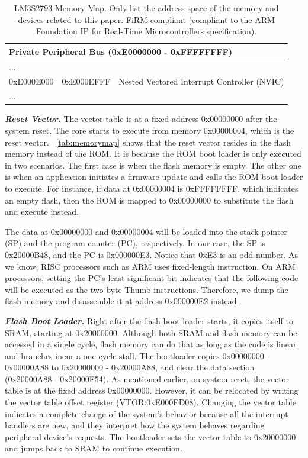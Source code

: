 \begin{center}
\begin{table}
\begin{tabular}{p{1.6cm}  p{1.6cm}  p{4cm}}
			\multicolumn{3}{l}{\textbf{Private Peripheral Bus} (0xE0000000 - 0xFFFFFFFF)}  \\
			\hline
			... & & \\
			\hline
			0xE000E000 & 0xE000EFFF & Nested Vectored Interrupt Controller (NVIC) \\
			\hline
			... & & \\
			\hline
		\end{tabular}
		\caption{LM3S2793 Memory Map. Only list the address space of the memory and devices related to this paper. FiRM-compliant (compliant to the ARM Foundation IP for Real-Time Microcontrollers specification).}
		\label{tab:memorymap}
	\end{table}
\end{center}


\textbf{\textit{Reset Vector.}} The vector table is at a fixed address 0x00000000 after the system reset. The core starts to execute from memory 0x00000004, which is the reset vector. ~\autoref{tab:memorymap} shows that the reset vector resides in the flash memory instead of the ROM. It is because the ROM boot loader is only executed in two scenarios. The first case is when the flash memory is empty. The other one is when an application initiates a firmware update and calls the ROM boot loader to execute. For instance, if data at 0x00000004 is 0xFFFFFFFF, which indicates an empty flash, then the ROM is mapped to 0x00000000 to substitute the flash and execute instead. 

The data at 0x00000000 and 0x00000004 will be loaded into the stack pointer (SP) and the program counter (PC), respectively. In our case, the SP is 0x20000B48, and the PC is 0x000000E3. Notice that 0xE3 is an odd number. As we know, RISC processors such as ARM uses fixed-length instruction. On ARM processors, setting the PC's least significant bit indicates that the following code will be executed as the two-byte Thumb instructions. Therefore, we dump the flash memory and disassemble it at address 0x000000E2 instead.



\textbf{\textit{Flash Boot Loader.}} Right after the flash boot loader starts, it copies itself to SRAM, starting at 0x20000000. Although both SRAM and flash memory can be accessed in a single cycle, flash memory can do that as long as the code is linear and branches incur a one-cycle stall. The bootloader copies 0x00000000 - 0x00000A88 to 0x20000000 - 0x20000A88, and clear the data section (0x20000A88 - 0x20000F54). As mentioned earlier, on system reset, the vector table is at the fixed address 0x00000000. However, it can be relocated by writing the vector table offset register (VTOR:0xE000ED08). Changing the vector table indicates a complete change of the system's behavior because all the interrupt handlers are new, and they interpret how the system behaves regarding peripheral device's requests. The bootloader sets the vector table to 0x20000000 and jumps back to SRAM to continue execution.


